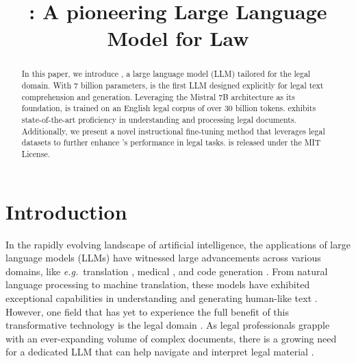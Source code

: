 \title{\ourmodel{}: A pioneering Large Language Model for Law}



\maketitle
\def\thefootnote{*}\def\thefootnote{\arabic{footnote}}
\begin{abstract}
In this paper, we introduce \ourmodel{}, a large language model (LLM) tailored for the legal domain. With 7 billion parameters, \ourmodel{} is the first LLM designed explicitly for legal text comprehension and generation. Leveraging the Mistral 7B architecture as its foundation, \ourmodel{} is trained on an English legal corpus of over 30 billion tokens. \ourmodel{} exhibits state-of-the-art proficiency in understanding and processing legal documents. Additionally, we present a novel instructional fine-tuning method that leverages legal datasets to further enhance \ourmodel{}'s performance in legal tasks. \ourmodel{} is released under the MIT License.
\end{abstract}

\section{Introduction}

In the rapidly evolving landscape of artificial intelligence, the applications of large language models (LLMs) \cite{achiam2023gpt,scao2022bloom,penedo2023refinedweb,touvron2023llama,jiang2023mistral,jiang2024mixtral,touvron2023llama2,bai2023qwen} have witnessed large advancements across various domains, like \textit{e.g.}\ translation \cite{xu2023paradigm}, medical \cite{chen2023meditron}, and code generation \cite{roziere2023code,li2023starcoder}. From natural language processing to machine translation, these models have exhibited exceptional capabilities in understanding and generating human-like text \cite{weber2023testing,islam2023distinguishing,mitchell2023detectgpt}. 
However, one field that has yet to experience the full benefit of this transformative technology is the legal domain \cite{martin2024better,licari2022italian}. As legal professionals grapple with an ever-expanding volume of complex documents, there is a growing need for a dedicated LLM that can help navigate and interpret legal material \cite{savelka2023explaining,katz2023gpt,xiao2021lawformer}.


